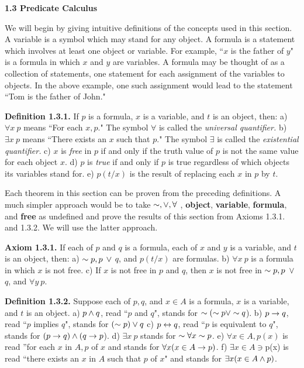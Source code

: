 \begin{large}

\newpage
\fl \textbf{1.3 Predicate Calculus}\nl

We will begin by giving intuitive definitions of the concepts used in this section. A variable is a symbol which may stand for any object. A formula is a statement which involves at least one object or variable. For example, ``$x$ is the father of $y$" is a formula in which $x$ and $y$ are variables. A formula may be thought of as a collection of statements, one statement for each assignment of the variables to objects. In the above example, one such assignment would lead to the statement ``Tom is the father of John."\nl

\fl \textbf{Definition 1.3.1.} If $p$ is a formula, $x$ is a variable, and $t$ is an object, then: \nl
 a) $\forall x~ p$ means ``For each $x, p$." The symbol $\forall$ is called the \textit{universal quantifier.} \nl
 b) $\exists x~ p$ means ``There exists an $x$ such that $p$." The symbol $\exists$ is called the \textit{existential quantifier.} \nl
 c) $x$ is \textit{free} in $p$ if and only if the truth value of $p$ is not the same value for each object $x$. \nl
 d) $p$ is \textit{true} if and only if $p$ is true regardless of which objects its variables stand for. \nl
 e) $p(t/x)$ is the result of replacing each $x$ in $p$ by $t$. \nl

Each theorem in this section can be proven from the preceding definitions. A much simpler approach would be to take $\sim ,\lor , \forall$ ,  \textbf{object}, \textbf{variable}, \textbf{formula}, and \textbf{free} as undefined and prove the results of this section from Axioms 1.3.1. and 1.3.2. We will use the latter approach. \nl

\textbf{Axiom 1.3.1.} If each of $p$ and $q$ is a formula, each of $x$ and $y$ is a variable, and $t$ is an object, then: \nl
 a) $\sim p, p$ $\lor$ $q$, and $p(t/x)$ are formulas. \nl
 b) $\forall x~ p$ is a formula in which $x$ is not free. \nl
 c) If $x$ is not free in $p$ and $q$, then $x$ is not free in  $\sim p, p$ $\lor$ $q$, and
$\forall y ~p$.\nl

\textbf{Definition 1.3.2.} Suppose each of $p, q$, and $x \in A$ is a formula, $x$ is a variable, and $t$ is an object.
\newpage
a) $p \wedge q$, read ``$p$ and $q$", stands for $\sim(\sim p \lor \sim q$).\nl
b) $p \to q$, read ``$p$ implies $q$", stands for $(\sim p) \lor q$ \nl
c) $p \leftrightarrow q$, read ``$p$ is equivalent to $q$", stands for $(p \to q) \wedge (q \to p$). \nl
d) $\exists x~p$  stands for $\sim \forall x \sim p$. \nl
e) $\forall x \in A, p(x)$ is read ''for each $x$ in $A, p$ of $x$ and stands for $\forall x(x \in A \to p)$. \nl
f) $\exists x \in A \ni $p(x) is read ``there exists an $x$ in $A$ such that  $p$ of $x$" and stands for $\exists x(x \in A \wedge p)$. \nl


\end{large}
